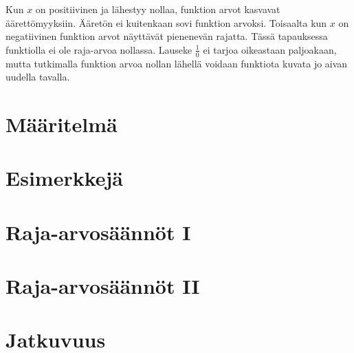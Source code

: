 Kun $x$ on positiivinen ja lähestyy nollaa, funktion arvot kasvavat äärettömyyksiin. Ääretön ei kuitenkaan sovi funktion arvoksi. Toisaalta kun $x$ on negatiivinen funktion arvot näyttävät pienenevän rajatta. Tässä tapauksessa funktiolla ei ole raja-arvoa nollassa. Lauseke $\frac{1}{0}$ ei tarjoa oikeastaan paljoakaan, mutta tutkimalla funktion arvoa nollan lähellä voidaan funktiota kuvata jo aivan uudella tavalla.

\section{Määritelmä}


\section{Esimerkkejä}


\section{Raja-arvosäännöt I}


\section{Raja-arvosäännöt II}


\section{Jatkuvuus}

\begin{tehtavasivu}

\end{tehtavasivu}
